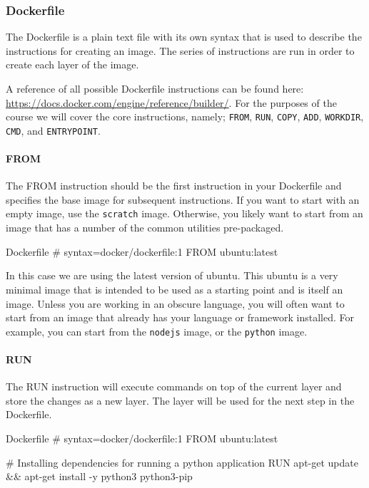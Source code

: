 \documentclass{csse4400}
\begin{document}
\subsubsection{Dockerfile}

The Dockerfile is a plain text file with its own syntax that is used to describe the instructions for creating an image.
The series of instructions are run in order to create each layer of the image.

A reference of all possible Dockerfile instructions can be found here: \url{https://docs.docker.com/engine/reference/builder/}.
For the purposes of the course we will cover the core instructions, namely;
\texttt{FROM}, \texttt{RUN}, \texttt{COPY}, \texttt{ADD}, \texttt{WORKDIR}, \texttt{CMD}, and \texttt{ENTRYPOINT}.

\paragraph{FROM}
The FROM instruction should be the first instruction in your Dockerfile and specifies the base image for subsequent instructions.
If you want to start with an empty image,
use the \texttt{scratch} image.
Otherwise, you likely want to start from an image that has a number of the common utilities pre-packaged.

\begin{code}[language=docker,numbers=none]{Dockerfile}
# syntax=docker/dockerfile:1
FROM ubuntu:latest
\end{code}

In this case we are using the latest version of ubuntu.
This ubuntu is a very minimal image that is intended to be used as a starting point and is itself an image.
Unless you are working in an obscure language,
you will often want to start from an image that already has your language or framework installed.
For example, you can start from the \texttt{nodejs} image,
or the \texttt{python} image.


\paragraph{RUN}
The RUN instruction will execute commands on top of the current layer and store the changes as a new layer.
The layer will be used for the next step in the Dockerfile.

\begin{code}[language=docker,numbers=none]{Dockerfile}
# syntax=docker/dockerfile:1
FROM ubuntu:latest

# Installing dependencies for running a python application
RUN apt-get update && apt-get install -y python3 python3-pip
\end{code}
\end{document}
